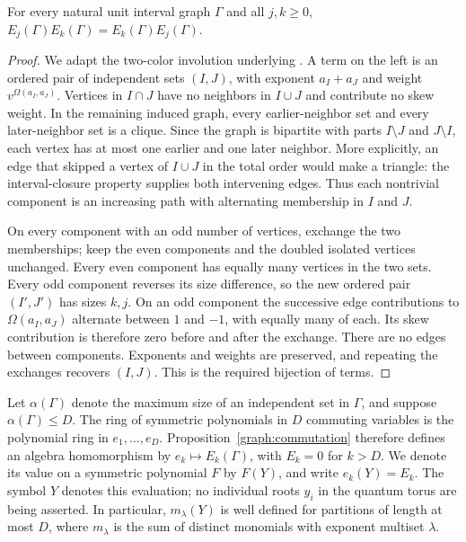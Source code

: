 \begin{proposition}
\label{graph:commutation}
For every natural unit interval graph $\Gamma$ and all $j,k\ge0$,
$E_j(\Gamma)E_k(\Gamma)=E_k(\Gamma)E_j(\Gamma)$.
\end{proposition}

\begin{proof}
We adapt the two-color involution underlying
\cite[Lemma~4.4 and Theorem~4.5]{SW16}.
A term on the left is an ordered pair of independent sets $(I,J)$,
with exponent $a_I+a_J$ and weight $v^{\Omega(a_I,a_J)}$.
Vertices in $I\cap J$ have no neighbors in $I\cup J$ and contribute
no skew weight. In the remaining induced graph, every earlier-neighbor
set and every later-neighbor set is a clique. Since the graph is
bipartite with parts $I\setminus J$ and $J\setminus I$, each vertex
has at most one earlier and one later neighbor. More explicitly, an
edge that skipped a vertex of $I\cup J$ in the total order would make
a triangle: the interval-closure property supplies both intervening
edges. Thus each nontrivial component is an increasing path with
alternating membership in $I$ and $J$.

On every component with an odd number of vertices, exchange the two
memberships; keep the even components and the doubled isolated
vertices unchanged. Every even component has equally many vertices in
the two sets. Every odd component reverses its size difference, so the
new ordered pair $(I',J')$ has sizes $k,j$. On an odd component the
successive edge contributions to $\Omega(a_I,a_J)$ alternate between
$1$ and $-1$, with equally many of each. Its skew contribution is
therefore zero before and after the exchange. There are no edges
between components. Exponents and weights are preserved, and repeating
the exchanges recovers $(I,J)$. This is the required bijection of
terms.
\end{proof}

Let $\alpha(\Gamma)$ denote the maximum size of an independent set in
$\Gamma$, and suppose $\alpha(\Gamma)\le D$. The ring of symmetric polynomials in
$D$ commuting variables is the polynomial ring in $e_1,\ldots,e_D$.
Proposition~\ref{graph:commutation} therefore defines an algebra
homomorphism by $e_k\mapsto E_k(\Gamma)$, with $E_k=0$ for $k>D$.
We denote its value on a symmetric polynomial $F$ by $F(Y)$, and
write $e_k(Y)=E_k$. The symbol $Y$ denotes this evaluation; no
individual roots $y_i$ in the quantum torus are being asserted.
In particular, $m_\lambda(Y)$ is well defined for partitions of length
at most $D$, where $m_\lambda$ is the sum of distinct monomials with
exponent multiset $\lambda$.

